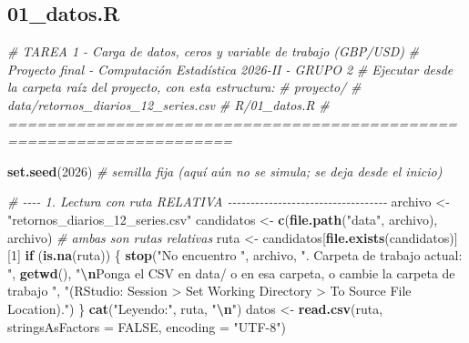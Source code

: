 \documentclass[
  spanish,
]{article}
\newenvironment{Shaded}{\begin{snugshade}}{\end{snugshade}}
\newcommand{\AttributeTok}[1]{\textcolor[rgb]{0.13,0.29,0.53}{#1}}
\newcommand{\CommentTok}[1]{\textcolor[rgb]{0.56,0.35,0.01}{\textit{#1}}}
\newcommand{\ConstantTok}[1]{\textcolor[rgb]{0.56,0.35,0.01}{#1}}
\newcommand{\ControlFlowTok}[1]{\textcolor[rgb]{0.13,0.29,0.53}{\textbf{#1}}}
\newcommand{\DecValTok}[1]{\textcolor[rgb]{0.00,0.00,0.81}{#1}}
\newcommand{\FunctionTok}[1]{\textcolor[rgb]{0.13,0.29,0.53}{\textbf{#1}}}
\newcommand{\NormalTok}[1]{#1}
\newcommand{\OtherTok}[1]{\textcolor[rgb]{0.56,0.35,0.01}{#1}}
\newcommand{\SpecialCharTok}[1]{\textcolor[rgb]{0.81,0.36,0.00}{\textbf{#1}}}
\newcommand{\StringTok}[1]{\textcolor[rgb]{0.31,0.60,0.02}{#1}}
\begin{document}
\subsection{01\_datos.R}\label{datos.r}

\begin{Shaded}
\begin{Highlighting}[]
\CommentTok{\# TAREA 1 {-} Carga de datos, ceros y variable de trabajo (GBP/USD)}
\CommentTok{\# Proyecto final {-} Computación Estadística 2026{-}II {-} GRUPO 2}
\CommentTok{\# Ejecutar desde la carpeta raíz del proyecto, con esta estructura:}
\CommentTok{\#   proyecto/}
\CommentTok{\#     data/retornos\_diarios\_12\_series.csv}
\CommentTok{\#     R/01\_datos.R}
\CommentTok{\# =====================================================================}

\FunctionTok{set.seed}\NormalTok{(}\DecValTok{2026}\NormalTok{)   }\CommentTok{\# semilla fija (aquí aún no se simula; se deja desde el inicio)}

\CommentTok{\# {-}{-}{-}{-} 1. Lectura con ruta RELATIVA {-}{-}{-}{-}{-}{-}{-}{-}{-}{-}{-}{-}{-}{-}{-}{-}{-}{-}{-}{-}{-}{-}{-}{-}{-}{-}{-}{-}{-}{-}{-}{-}{-}{-}{-}}
\NormalTok{archivo }\OtherTok{\textless{}{-}} \StringTok{"retornos\_diarios\_12\_series.csv"}
\NormalTok{candidatos }\OtherTok{\textless{}{-}} \FunctionTok{c}\NormalTok{(}\FunctionTok{file.path}\NormalTok{(}\StringTok{"data"}\NormalTok{, archivo), archivo)   }\CommentTok{\# ambas son rutas relativas}
\NormalTok{ruta }\OtherTok{\textless{}{-}}\NormalTok{ candidatos[}\FunctionTok{file.exists}\NormalTok{(candidatos)][}\DecValTok{1}\NormalTok{]}
\ControlFlowTok{if}\NormalTok{ (}\FunctionTok{is.na}\NormalTok{(ruta)) \{}
  \FunctionTok{stop}\NormalTok{(}\StringTok{"No encuentro \textquotesingle{}"}\NormalTok{, archivo, }\StringTok{"\textquotesingle{}. Carpeta de trabajo actual: "}\NormalTok{, }\FunctionTok{getwd}\NormalTok{(),}
       \StringTok{"}\SpecialCharTok{\textbackslash{}n}\StringTok{Ponga el CSV en \textquotesingle{}data/\textquotesingle{} o en esa carpeta, o cambie la carpeta de trabajo "}\NormalTok{,}
       \StringTok{"(RStudio: Session \textgreater{} Set Working Directory \textgreater{} To Source File Location)."}\NormalTok{)}
\NormalTok{\}}
\FunctionTok{cat}\NormalTok{(}\StringTok{"Leyendo:"}\NormalTok{, ruta, }\StringTok{"}\SpecialCharTok{\textbackslash{}n}\StringTok{"}\NormalTok{)}
\NormalTok{datos }\OtherTok{\textless{}{-}} \FunctionTok{read.csv}\NormalTok{(ruta, }\AttributeTok{stringsAsFactors =} \ConstantTok{FALSE}\NormalTok{, }\AttributeTok{encoding =} \StringTok{"UTF{-}8"}\NormalTok{)}


\end{Highlighting}
\end{Shaded}
\end{document}
